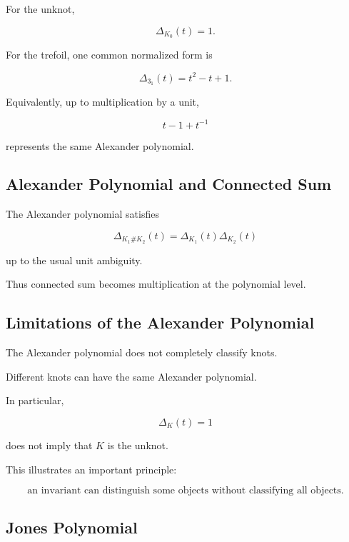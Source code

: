 For the unknot,

\[
\boxed{
\Delta_{K_0}(t)=1.
}
\]

For the trefoil, one common normalized form is

\[
\boxed{
\Delta_{3_1}(t)
=
t^2-t+1.
}
\]

Equivalently, up to multiplication by a unit,

\[
t-1+t^{-1}
\]

represents the same Alexander polynomial.

\subsection{Alexander Polynomial and Connected Sum}
\label{subsec:alexander-connected-sum}

The Alexander polynomial satisfies

\[
\boxed{
\Delta_{K_1\#K_2}(t)
=
\Delta_{K_1}(t)\Delta_{K_2}(t)
}
\]

up to the usual unit ambiguity.

Thus connected sum becomes multiplication at the polynomial level.

\subsection{Limitations of the Alexander Polynomial}
\label{subsec:limitations-alexander-polynomial}

The Alexander polynomial does not completely classify knots.

Different knots can have the same Alexander polynomial.

In particular,

\[
\boxed{
\Delta_K(t)=1
}
\]

does not imply that \(K\) is the unknot.

This illustrates an important principle:

\[
\boxed{
\text{an invariant can distinguish some objects without classifying all objects}.
}
\]

\subsection{Jones Polynomial}
\label{subsec:jones-polynomial}

